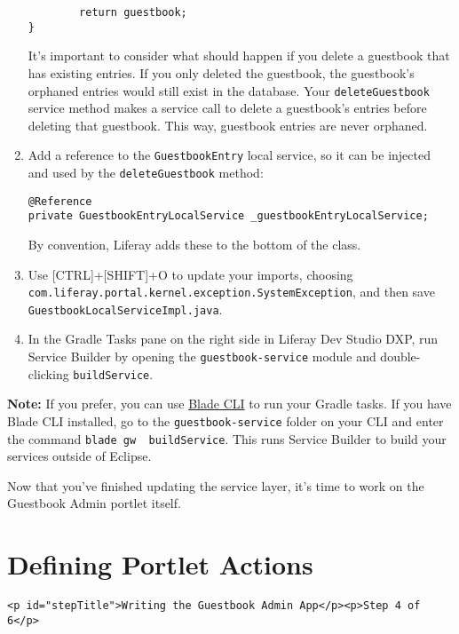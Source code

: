 \begin{enumerate}
\begin{verbatim}
        return guestbook;
}
\end{verbatim}

  It's important to consider what should happen if you delete a
  guestbook that has existing entries. If you only deleted the
  guestbook, the guestbook's orphaned entries would still exist in the
  database. Your \texttt{deleteGuestbook} service method makes a service
  call to delete a guestbook's entries before deleting that guestbook.
  This way, guestbook entries are never orphaned.
\item
  Add a reference to the \texttt{GuestbookEntry} local service, so it
  can be injected and used by the \texttt{deleteGuestbook} method:

\begin{verbatim}
@Reference
private GuestbookEntryLocalService _guestbookEntryLocalService;
\end{verbatim}

  By convention, Liferay adds these to the bottom of the class.
\item
  Use {[}CTRL{]}+{[}SHIFT{]}+O to update your imports, choosing
  \texttt{com.liferay.portal.kernel.exception.SystemException}, and then
  save \texttt{GuestbookLocalServiceImpl.java}.
\item
  In the Gradle Tasks pane on the right side in Liferay Dev Studio DXP,
  run Service Builder by opening the \texttt{guestbook-service} module
  and double-clicking \texttt{buildService}.
\end{enumerate}

\noindent\hrulefill

\textbf{Note:} If you prefer, you can use
\href{/docs/7-2/reference/-/knowledge_base/r/blade-cli}{Blade CLI} to
run your Gradle tasks. If you have Blade CLI installed, go to the
\texttt{guestbook-service} folder on your CLI and enter the command
\texttt{blade\ gw\ \ buildService}. This runs Service Builder to build
your services outside of Eclipse.

\noindent\hrulefill

Now that you've finished updating the service layer, it's time to work
on the Guestbook Admin portlet itself.

\chapter{Defining Portlet Actions}\label{defining-portlet-actions}

\begin{verbatim}
<p id="stepTitle">Writing the Guestbook Admin App</p><p>Step 4 of 6</p>
\end{verbatim}


